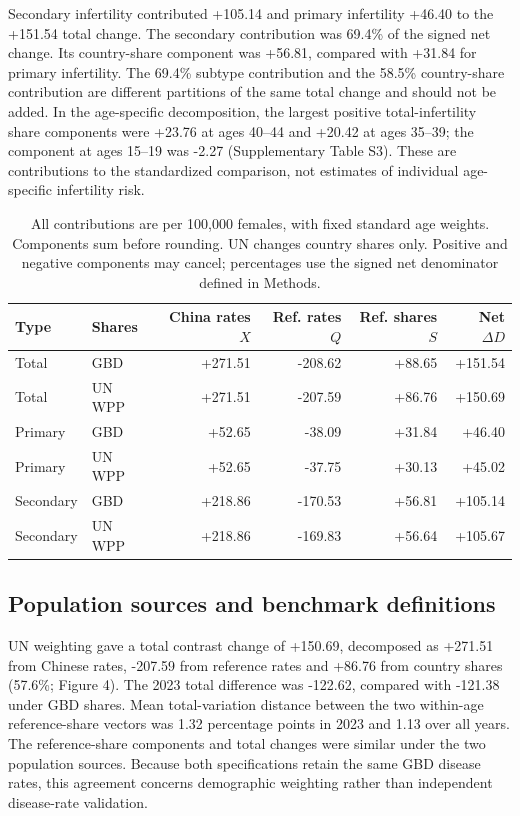 \documentclass[11pt,a4paper]{article}
\begin{document}
{\color{blue} Secondary infertility contributed +105.14 and primary infertility +46.40 to the +151.54 total change. The secondary contribution was 69.4\% of the signed net change. Its country-share component was +56.81, compared with +31.84 for primary infertility. The 69.4\% subtype contribution and the 58.5\% country-share contribution are different partitions of the same total change and should not be added. In the age-specific decomposition, the largest positive total-infertility share components were +23.76 at ages 40--44 and +20.42 at ages 35--39; the component at ages 15--19 was -2.27 (Supplementary Table S3). These are contributions to the standardized comparison, not estimates of individual age-specific infertility risk.}

\begin{table}[htbp]\centering\small{}
\caption{Symmetric PCOS contrast-change decomposition, 1990--2023, by population source.}\label{tab:decomp}
\setlength{\tabcolsep}{4pt}
\begin{tabular}{llrrrr}\toprule
Type & Shares & China rates $X$ & Ref. rates $Q$ & Ref. shares $S$ & Net $\Delta D$\\\midrule
Total & GBD & +271.51 & -208.62 & +88.65 & +151.54\\
Total & UN WPP & +271.51 & -207.59 & +86.76 & +150.69\\
Primary & GBD & +52.65 & -38.09 & +31.84 & +46.40\\
Primary & UN WPP & +52.65 & -37.75 & +30.13 & +45.02\\
Secondary & GBD & +218.86 & -170.53 & +56.81 & +105.14\\
Secondary & UN WPP & +218.86 & -169.83 & +56.64 & +105.67\\
\bottomrule
\end{tabular}
\caption*{All contributions are per 100,000 females, with fixed standard age weights. Components sum before rounding. UN changes country shares only. Positive and negative components may cancel; percentages use the signed net denominator defined in Methods.}
\end{table}

{\color{blue} \subsection{Population sources and benchmark definitions}
UN weighting gave a total contrast change of +150.69, decomposed as +271.51 from Chinese rates, -207.59 from reference rates and +86.76 from country shares (57.6\%; Figure 4). The 2023 total difference was -122.62, compared with -121.38 under GBD shares. Mean total-variation distance between the two within-age reference-share vectors was 1.32 percentage points in 2023 and 1.13 over all years. The reference-share components and total changes were similar under the two population sources. Because both specifications retain the same GBD disease rates, this agreement concerns demographic weighting rather than independent disease-rate validation.}
\end{document}
